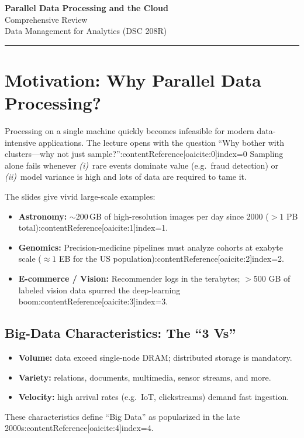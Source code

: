 \documentclass[11pt]{article}
\begin{document}
\begin{center}
  {\LARGE\bfseries Parallel Data Processing and the Cloud}\\[2mm]
  {\large Comprehensive Review}\\[1mm]
  {\normalsize Data Management for Analytics (DSC 208R)}
\end{center}
\vspace{-1em}
\hrule
\vspace{1em}

\tableofcontents
\newpage

\section{Motivation: Why Parallel Data Processing?}

Processing on a single machine quickly becomes infeasible for modern data-intensive applications.  
The lecture opens with the question ``Why bother with clusters—why not just sample?'':contentReference[oaicite:0]{index=0}  Sampling alone fails whenever
\emph{(i)}~rare events dominate value (e.g.\ fraud detection) or  
\emph{(ii)}~model variance is high and lots of data are required to tame it.

The slides give vivid large-scale examples:

\begin{itemize}[itemsep=0pt]
  \item \textbf{Astronomy:} $\sim200\,$GB of high-resolution images per day since 2000 ($>1$ PB total):contentReference[oaicite:1]{index=1}.
  \item \textbf{Genomics:} Precision-medicine pipelines must analyze cohorts at exabyte scale ($\approx1$ EB for the US population):contentReference[oaicite:2]{index=2}.
  \item \textbf{E-commerce / Vision:} Recommender logs in the terabytes; $>$500 GB of labeled vision data spurred the deep-learning boom:contentReference[oaicite:3]{index=3}.
\end{itemize}

\subsection{Big-Data Characteristics: The “3 Vs”}

\begin{itemize}
  \item \textbf{Volume:} data exceed single-node DRAM; distributed storage is mandatory.
  \item \textbf{Variety:} relations, documents, multimedia, sensor streams, and more.
  \item \textbf{Velocity:} high arrival rates (e.g.\ IoT, clickstreams) demand fast ingestion.
\end{itemize}
These characteristics define ``Big Data'' as popularized in the late 2000s:contentReference[oaicite:4]{index=4}.
\end{document}
